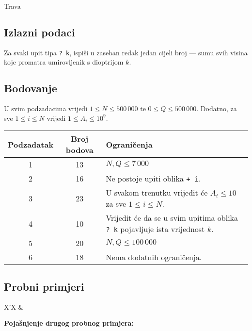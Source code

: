 \begin{statement}[
  problempoints=100,
  timelimit=1 sekunda,
  memorylimit=512 MiB,
]{Trava}
\subsection*{Izlazni podaci}

Za svaki upit tipa \texttt{\frenchspacing? k}, ispiši u zaseban redak jedan cijeli broj — sumu svih visina koje promatra umirovljenik s dioptrijom $k$.

\subsection*{Bodovanje}

U svim podzadacima vrijedi $1 \leq N \leq 500\,000$ te $0 \leq Q \leq 500\,000$. Dodatno, za sve $1 \leq i \leq N$ vrijedi $1 \leq A_i \leq 10^9$.

{\renewcommand{\arraystretch}{1.4}
  \setlength{\tabcolsep}{6pt}
  \begin{tabular}{ccl}
   Podzadatak & Broj bodova & Ograničenja \\ \midrule
   	1 & 13 & $N, Q \leq 7\,000$ \\
   	2 & 16 & Ne postoje upiti oblika \texttt{+ i}. \\
   	3 & 23 & U svakom trenutku vrijedit će $A_i \leq 10$ za sve $1 \leq i \leq N$. \\
   	4 & 10 & Vrijedit će da se u svim upitima oblika \texttt{\frenchspacing? k} pojavljuje ista vrijednost $k$. \\
   	5 & 20 & $N, Q \leq 100\,000$ \\
   	6 & 18 & Nema dodatnih ograničenja. \\ 
\end{tabular}}

\subsection*{Probni primjeri}
\begin{tabularx}{\textwidth}{X'X}
 &
\end{tabularx}

\pagebreak

\textbf{Pojašnjenje drugog probnog primjera:}\\


\end{statement}

